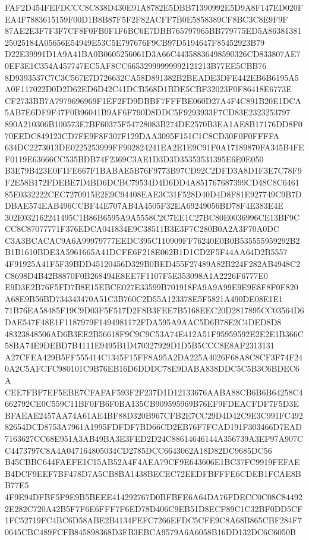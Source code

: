 \documentclass[UTF8,fontset=fandol,zihao=-4,a4paper]{ctexart}
\begin{document}
{{FAF2D454FEFDCCC8C838D430E91A8782E5DBB71390992E5D9A8F147ED020FEA4F7883615159F00D1B8B87F5F2F82ACFF7B0E5858389CF8BC3C8E9F9F
87AE2E3F7F3F7CF8F0FB0F1F6BC6E7DBB765797965BB779775ED5A8638138125025184A05656E54949E53C5E797676F9CB97D5194647F85452923B79
D22E39991D1A9A41BA0B0605256061D3A66C44358836498590326CD833807AE70EF3E1C354A457747EC5AF8CC66532999999992121213B77EE5CBB76
8D9393537C7C3C567E7D726632CA58D891382B2BEADE3DFE442EB6B6195A5A0F117022D0D2D62ED6D42C41DCB568D1BDE5CBF32023F0F86418E6773E
CF2733BB7A7979696969F1EF2FD9DBBF7FFFBE060D27A4F4C891B20E1DCA5AB7E6DF9F47F0B96041B9AF6F790D8DDC5F9293933F7CD83E2323253797
890A210306B100573E7BF60375F54728083B274DE2570B3EA1AE8B17176DD8F070EEDC849123CD7FE9F8F307F129DAA3095F151C1C8CD30F0F0FFFFA
634DC2273013DE0225253999FF902824241EA2E1E9C91F0A17189870FA345B4FEF0119E63666CC535BDB74F2369C3AE1D3D3D35353531395E6E0E050
B3E79B423E0F1FE667F1BABAE5B76F9773B97CD92C2DFD3A8D1F3E7C78F9F2E58B172FDEBE7D4BD6DCBC79534D4D6DD4A851767687399CD48C8C6461
85E0332222CEC7270915E2E9C94408EAE3C31F528D40D4D8F81E927749C9B7DDBAE574EAB496CCBF44E707AB4A4505F32EA69249056BD78F4E383E4E
302E032162241495C1B86B6595A9A5558C2C7EE1C27BC80E0036996CE13BF9CCC8C87077771F376EDCA041834E9C38511B3E3F7C280B0A2A3F70A0DC
C3A3BCACAC9A6A99979777EEDC395C110909FF76240E0B0B535555959292B2B1B1610BDE3A5961665A41DCFE6F218E062B1D1CD2F5F44AA64D2B5557
4F91925A41F5F39BDD45120456D329B0BED455F27489A82B224F282AB4948C2C8698D4B42B8870F0B268494E8EE7F1107F5E353098A1A2226F6777E0
E9D3E2B76F5FD7B8E15EBCE027E33599B701918FA9A9A99E9E9E8F8F0F820A68E9B56BD734343470A51C3B760C2D55A123378E5F5821A490DE08E1E1
71B76EA58485F19C9D03F5F517D2F8B3FEE7B5168EEC20D2817895CC03564D6DAE547F48E1F1187979F1494981172FDA595A9AAC5D6B78E2C4DED8D8
48323848506AD6B3EE2B56618F9C9C9C53A74E412A51F95959592E2E2E1B366C58BA74E9DEBD7B4111E9495B1D470327929D1D5B5CCC8E8AF2313131
A27CFEA429B5FF555414C1345F15FF8A95A2DA225A4026F68A8C8CF3F74F240A2C5AFCFC980101C9B76EB16D6DDDC78E9DABA838DDC5C5B3C6BDEC6A
CEE7FBF7EF5EBE7CFAFAF593F2F237D1D12133676AABA88CB6B6B64258C4662792CE0C559C11BF0FB6F0BA135CB909595969B76EF9FDEACFDF7F5D3E
BFAEAE2457AA74A61AE4BF88D320B967CFB2E7CC29D4D42C9E3C991FC49282654DCD8753A7961A1995FDFDF7BD66CD2EB76F7FCAD191F303466D7EAD
7163627CC68E951A3AB49BA3E3FED2D24C88614646144A356739A3EF97A907CC4473797C8A4A047164805034CD2785DCC6643062A18D82DC9685DC56
B45CBBC644FAEFE1C15AB52A4F4AEA79CF9E643606E1BC37FC9919FEFAEB4DCF9EEF7BF478D7A5CB8BA1438BECEC72EEDFBFFFE6CDEB1FCAE8BB77E5
4F9E94DFBF5F9E9B5BEEE414292767D0BFBFE6A64DA76FDECC0C08C844922E282C720A42B5F7F6E6FFF7F6ED78D406C9EB51D8ECF89C1C32BF0DD5CF
1FC52719FC4BC6D58ABE2B4134FEFC7266EFDC5CFE9C8A68B865CBF284F70645CBC489FCFB845898368D3FB3EBCA9579A6A6058B16DD132DC6C6050B
}}
\end{document}
